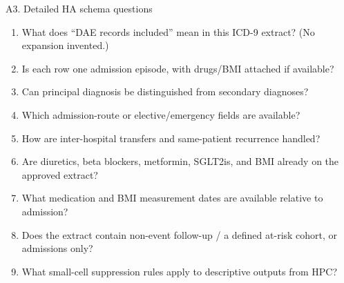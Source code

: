 \documentclass[aspectratio=169,10pt]{beamer}
\begin{document}
\begin{frame}{A3. Detailed HA schema questions}
  \footnotesize
  \begin{enumerate}
    \item What does ``DAE records included'' mean in this ICD-9 extract? (No expansion invented.)
    \item Is each row one admission episode, with drugs/BMI attached if available?
    \item Can principal diagnosis be distinguished from secondary diagnoses?
    \item Which admission-route or elective/emergency fields are available?
    \item How are inter-hospital transfers and same-patient recurrence handled?
    \item Are diuretics, beta blockers, metformin, SGLT2is, and BMI already on the approved extract?
    \item What medication and BMI measurement dates are available relative to admission?
    \item Does the extract contain non-event follow-up / a defined at-risk cohort, or admissions only?
    \item What small-cell suppression rules apply to descriptive outputs from HPC?
  \end{enumerate}
\end{frame}
\end{document}
